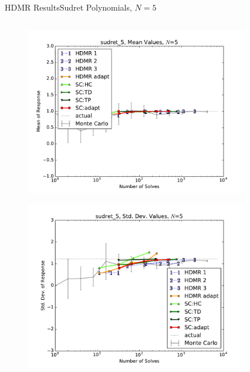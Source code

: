 \documentclass{beamer}
\begin{document}
\begin{frame}{HDMR Results}{Sudret Polynomials, $N=5$}\vspace{-20pt}
 \begin{columns}
   \begin{column}{0.5\textwidth}
        \begin{figure}[h!]
          \centering
          \includegraphics[width=0.8\linewidth]{anlmodels/sudret_5_mean_vals}
        \end{figure}
        \vspace{-20pt}
        \begin{figure}[h!]
          \centering
          \includegraphics[width=0.8\linewidth]{anlmodels/sudret_5_var_vals}
        \end{figure}
   \end{column}
   \begin{column}{0.5\textwidth}
        \begin{figure}[h!]
          \centering

\end{figure}
\end{column}
\end{columns}
\end{frame}
\end{document}
